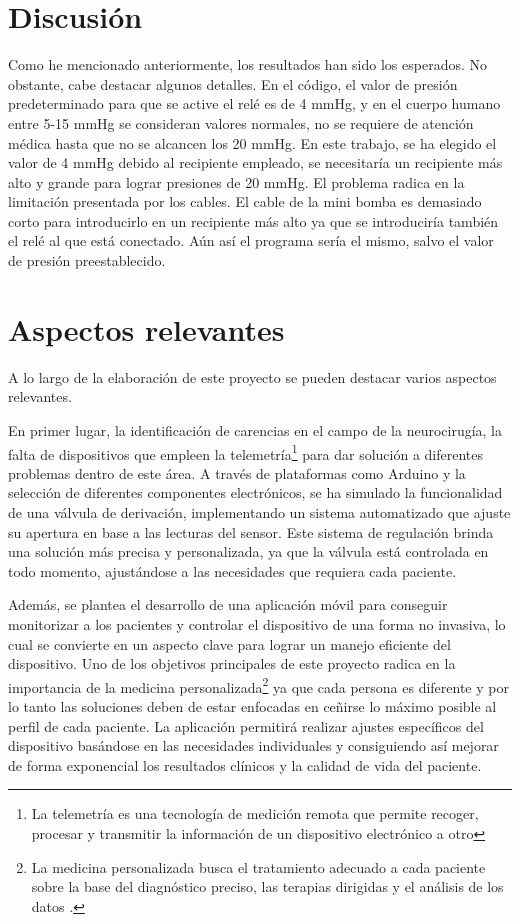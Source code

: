 \newpage

\section{Discusión}
Como he mencionado anteriormente, los resultados han sido los esperados. No obstante, cabe destacar algunos detalles. En el código, el valor de presión predeterminado para que se active el relé es de 4 mmHg, y en el cuerpo humano entre 5-15 mmHg se consideran valores normales, no se requiere de atención médica hasta que no se alcancen los 20 mmHg. En este trabajo, se ha elegido el valor de 4 mmHg debido al recipiente empleado, se necesitaría un recipiente más alto y grande para lograr presiones de 20 mmHg. El problema radica en la limitación presentada por los cables. El cable de la mini bomba es demasiado corto para introducirlo en un recipiente más alto ya que se introduciría también el relé al que está conectado. Aún así el programa sería el mismo, salvo el valor de presión preestablecido. 

\section{Aspectos relevantes}

A lo largo de la elaboración de este proyecto se pueden destacar varios aspectos relevantes. 

En primer lugar, la identificación de carencias en el campo de la neurocirugía, la falta de dispositivos que empleen la telemetría\footnote{La telemetría es una tecnología de medición remota que permite recoger, procesar y transmitir la información de un dispositivo electrónico a otro\cite{telemetria}} para dar solución a diferentes problemas dentro de este área. A través de plataformas como Arduino y la selección de diferentes componentes electrónicos, se ha simulado la funcionalidad de una válvula de derivación, implementando un sistema automatizado que ajuste su apertura en base a las lecturas del sensor. Este sistema de regulación brinda una solución más precisa y personalizada, ya que la válvula está controlada en todo momento, ajustándose a las necesidades que requiera cada paciente. 

Además, se plantea el desarrollo de una aplicación móvil para conseguir monitorizar a los pacientes y controlar el dispositivo de una forma no invasiva, lo cual se convierte en un aspecto clave para lograr un manejo eficiente del dispositivo. Uno de los objetivos principales de este proyecto radica en la importancia de la medicina personalizada\footnote{La medicina personalizada busca el tratamiento adecuado a cada paciente sobre la base del diagnóstico preciso, las terapias dirigidas y el análisis de los datos \cite{med_per}.} ya que cada persona es diferente y por lo tanto las soluciones deben de estar enfocadas en ceñirse lo máximo posible al perfil de cada paciente. La aplicación permitirá realizar ajustes específicos del dispositivo basándose en las necesidades individuales y consiguiendo así mejorar de forma exponencial los resultados clínicos y la calidad de vida del paciente.

